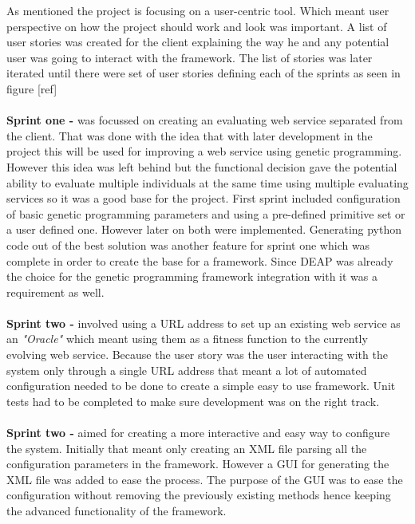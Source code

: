 As mentioned the project is focusing on a user-centric tool. Which meant user perspective on how
the project should work and look was important. A list of user stories was created for the client
explaining the way he and any potential user was going to interact with the framework. The list
of stories was later iterated until there were set of user stories defining each of the sprints
as seen in figure [ref]
\paragraph{}
\textbf{Sprint one - } was focussed on creating an evaluating web service separated from the client.
That was done with the idea that with later development in the project this will be used for
improving a web service using genetic programming. However this idea was left behind but the functional
decision gave the potential ability to evaluate multiple individuals at the same time using multiple
evaluating services so it was a good base for the project. First sprint included configuration of 
basic genetic programming parameters and using a pre-defined primitive set or a user defined one.
However later on both were implemented. Generating python code out of the best solution was another 
feature for sprint one which was complete in order to create the base for a framework. Since
DEAP was already the choice for the genetic programming framework integration with it was a requirement as well.
\paragraph{}
\textbf{Sprint two - } involved using a URL address to set up an existing web service as an \textit{"Oracle"}
which meant using them as a fitness function to the currently evolving web service. Because the user story was the user interacting with
the system only through a single URL address that meant a lot of automated configuration needed to be done to create
a simple easy to use framework. Unit tests had to be
completed to make sure development was on the right track. 
\paragraph{}
\textbf{Sprint two - } aimed for creating a more interactive and easy way to configure the system. Initially that
meant only creating an XML file parsing all the configuration parameters in the framework. However a GUI for generating
the XML file was added to ease the process. The purpose of the GUI was to ease the configuration without removing the
previously existing methods hence keeping the advanced functionality of the framework.